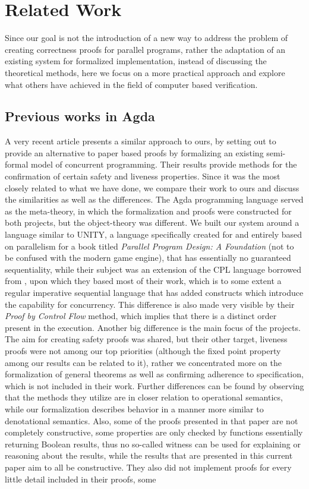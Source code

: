 \chapter{Related Work}
\label{sec:related}

Since our goal is not the introduction of a new way to address the problem of creating correctness proofs for parallel programs, rather the adaptation of an existing system for formalized implementation, instead of discussing the theoretical methods, here we focus on a more practical approach and explore what others have achieved in the field of computer based verification.

\section{Previous works in Agda}
A very recent article \cite{Bergsten2017MethodsFU} presents a similar approach to ours, by setting out to provide an alternative to paper based proofs by formalizing an existing semi-formal model of concurrent programming. Their results provide methods for the confirmation of certain safety and liveness properties. Since it was the most closely related to what we have done, we compare their work to ours and discuss the similarities as well as the differences. The Agda programming language served as the meta-theory, in which the formalization and proofs were constructed for both projects, but the object-theory was different. We built our system around a language similar to UNITY, a language specifically created for and entirely based on parallelism for a book titled \textit{Parallel Program Design: A Foundation}\cite{misra1989foundation} (not to be confused with the modern game engine), that has essentially no guaranteed sequentiality, while their subject was an extension of the CPL language borrowed from \cite{owicki1982proving}, upon which they based most of their work, which is to some extent a regular imperative sequential language that has added constructs which introduce the capability for concurrency. This difference is also made very visible by their \textit{Proof by Control Flow} method, which implies that there is a distinct order present in the execution. Another big difference is the main focus of the projects. The aim for creating safety proofs was shared, but their other target, liveness proofs were not among our top priorities (although the fixed point property among our results can be related to it), rather we concentrated more on the formalization of general theorems as well as confirming adherence to specification, which is not included in their work. Further differences can be found by observing that the methods they utilize are in closer relation to operational semantics, while our formalization describes behavior in a manner more similar to denotational semantics. Also, some of the proofs presented in that paper are not completely constructive, some properties are only checked by functions essentially returning Boolean results, thus no so-called witness can be used for explaining or reasoning about the results, while the results that are presented in this current paper aim to all be constructive. They also did not implement proofs for every little detail included in their proofs, some 